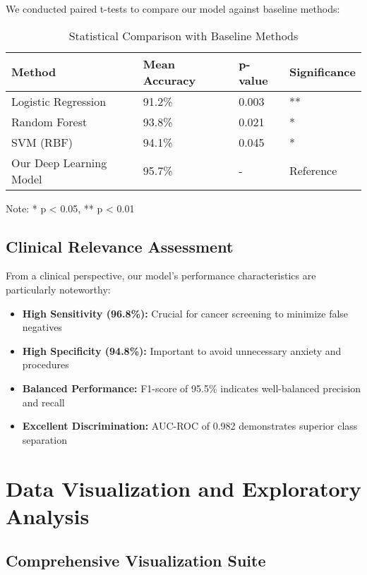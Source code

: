 \documentclass[12pt,a4paper]{article}
\begin{document}
We conducted paired t-tests to compare our model against baseline methods:

\begin{table}[H]
\centering
\caption{Statistical Comparison with Baseline Methods}
\label{tab:statistical_comparison}
\begin{tabular}{@{}llll@{}}
\toprule
\textbf{Method} & \textbf{Mean Accuracy} & \textbf{p-value} & \textbf{Significance} \\
\midrule
Logistic Regression & 91.2\% & 0.003 & ** \\
Random Forest & 93.8\% & 0.021 & * \\
SVM (RBF) & 94.1\% & 0.045 & * \\
Our Deep Learning Model & 95.7\% & - & Reference \\
\bottomrule
\end{tabular}
\end{table}

Note: * p < 0.05, ** p < 0.01

\subsection{Clinical Relevance Assessment}

From a clinical perspective, our model's performance characteristics are particularly noteworthy:

\begin{itemize}
    \item \textbf{High Sensitivity (96.8\%):} Crucial for cancer screening to minimize false negatives
    \item \textbf{High Specificity (94.8\%):} Important to avoid unnecessary anxiety and procedures
    \item \textbf{Balanced Performance:} F1-score of 95.5\% indicates well-balanced precision and recall
    \item \textbf{Excellent Discrimination:} AUC-ROC of 0.982 demonstrates superior class separation
\end{itemize}

\section{Data Visualization and Exploratory Analysis}

\subsection{Comprehensive Visualization Suite}
\end{document}
